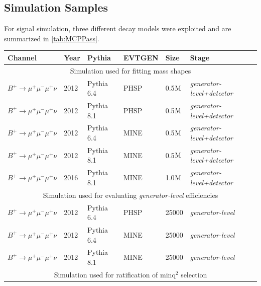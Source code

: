 \subsection{Simulation Samples}
\label{Simulation Samples}
For signal simulation, three different decay models were exploited and are summarized in \autoref{tab:MCPPass}.

\begin{table}[h!]
	\begin{center}
		\begin{tabular}{l l l l l l}

			Channel & Year & Pythia  & EVTGEN & Size & Stage \\ \hline
			 \multicolumn{6}{c}{Simulation used for fitting mass shapes} \\ \hline
			$B^{+} \rightarrow \mu^{+} \mu^{-} \mu^{+} \nu$ & 2012 & Pythia 6.4\cite{pythia6} & PHSP & 0.5$\rm{M}$ & \textit{generator-level+detector}\\
			$B^{+} \rightarrow \mu^{+} \mu^{-} \mu^{+} \nu$ & 2012 & Pythia 8.1\cite{pythia8} & PHSP & 0.5$\rm{M}$ & \textit{generator-level+detector}\\
			$B^{+} \rightarrow \mu^{+} \mu^{-} \mu^{+} \nu$ & 2012 & Pythia 6.4\cite{pythia6} & MINE & 0.5$\rm{M}$ & \textit{generator-level+detector}\\
			$B^{+} \rightarrow \mu^{+} \mu^{-} \mu^{+} \nu$ & 2012 & Pythia 8.1\cite{pythia8} & MINE & 0.5$\rm{M}$ & \textit{generator-level+detector}\\
			$B^{+} \rightarrow \mu^{+} \mu^{-} \mu^{+} \nu$ & 2016 & Pythia 8.1\cite{pythia8} & MINE & 1.0$\rm{M}$ & \textit{generator-level+detector}\\ \hline
			 \multicolumn{6}{c}{Simulation used for evaluating \textit{generator-level} efficiencies} \\ \hline
			$B^{+} \rightarrow \mu^{+} \mu^{-} \mu^{+} \nu$ & 2012 & Pythia 6.4\cite{pythia6} & PHSP & 25000 & \textit{generator-level}\\ %
			$B^{+} \rightarrow \mu^{+} \mu^{-} \mu^{+} \nu$ & 2012 & Pythia 6.4\cite{pythia6} & MINE & 25000 & \textit{generator-level}\\
			$B^{+} \rightarrow \mu^{+} \mu^{-} \mu^{+} \nu$ & 2012 & Pythia 8.1\cite{pythia8} & MINE & 25000 & \textit{generator-level}\\ \hline

                         \multicolumn{6}{c}{Simulation used for ratification of minq$^{2}$ selection} \\ \hline 


\end{tabular}
\end{center}
\end{table}
